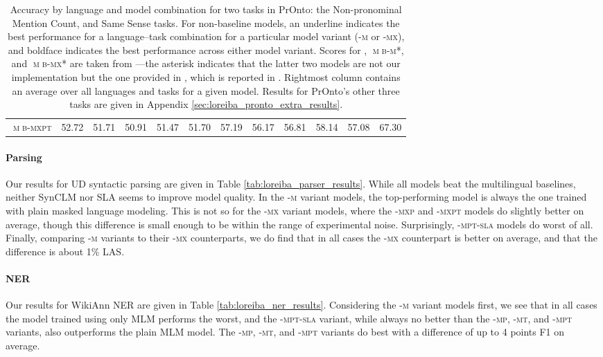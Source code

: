 \documentclass[11pt]{article}
\begin{document}
\begin{table*}[t]
\begin{tabular}{@{}l|cccc|c||cccc|c||c}
        \textsc{$\upmu$b-mxpt}       & 52.72    & 51.71    & 50.91  & 51.47 & 51.70 & 57.19    & 56.17  & 56.81  & 58.14 & 57.08 & 67.30  \\
    \end{tabular}
    \caption{Accuracy by language and model combination for two tasks in PrOnto: the Non-pronominal Mention Count, and Same Sense tasks. For non-baseline models, an underline indicates the best performance for a language--task combination for a particular model variant (\textsc{-m} or \textsc{-mx}), and boldface indicates the best performance across either model variant. Scores for \mbert{}, \textsc{$\upmu$b-m*}, and \textsc{$\upmu$b-mx*} are taken from \citet{gessler2023pronto}---the asterisk indicates that the latter two models are not our implementation but the one provided in \citet{gessler-zeldes-2022-microbert}, which is reported in \citet{gessler2023pronto}. Rightmost column contains an average over all languages and tasks for a given model. Results for PrOnto's other three tasks are given in Appendix \ref{sec:loreiba_pronto_extra_results}.}
    \label{tab:loreiba_pronto_results}
\end{table*}

\paragraph{Parsing} 
Our results for UD syntactic parsing are given in Table \ref{tab:loreiba_parser_results}.
While all models beat the multilingual baselines, neither SynCLM nor SLA seems to improve model quality.
In the \textsc{-m} variant models, the top-performing model is always the one trained with plain masked language modeling.
This is not so for the \textsc{-mx} variant models, where the \textsc{-mxp} and \textsc{-mxpt} models do slightly better on average, though this difference is small enough to be within the range of experimental noise.
Surprisingly, \textsc{-mpt-sla} models do worst of all.
Finally, comparing \textsc{-m} variants to their \textsc{-mx} counterparts, we do find that in all cases the \textsc{-mx} counterpart is better on average, and that the difference is about 1\% LAS.

\paragraph{NER}
Our results for WikiAnn NER are given in Table \ref{tab:loreiba_ner_results}.
Considering the \textsc{-m} variant models first, we see that in all cases the model trained using only MLM performs the worst, and the \textsc{-mpt-sla} variant, while always no better than the \textsc{-mp}, \textsc{-mt}, and \textsc{-mpt} variants, also outperforms the plain MLM model.
The \textsc{-mp}, \textsc{-mt}, and \textsc{-mpt} variants do best with a difference of up to 4 points F1 on average.
\end{document}
